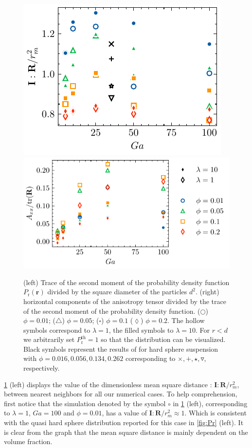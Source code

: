 \begin{figure}[h!]
    \centering
    \includegraphics[height=0.3\textwidth]{image/HOMOGENEOUS_NEW/PA/trR.pdf}
    \includegraphics[height=0.3\textwidth]{image/HOMOGENEOUS_NEW/PA/Axx.pdf}
    \caption{
        (left) Trace of the second moment of the probability density function $P_\text{r}(\textbf{r})$ divided by the square diameter of the particles $d^2$. 
        (right) horizontal components of the anisotropy tensor divided by the trace of the second moment of the probability density function.
    ($\pmb\bigcirc$) $\phi = 0.01$; ($\pmb\triangle$) $ \phi = 0.05$; ($\pmb\square$) $\phi = 0.1$ ($\pmb\lozenge$) $\phi = 0.2$.
    The hollow symbols correspond to $\lambda = 1$, the filled symbols to $\lambda = 10$.
    For $r<d$ we arbitrarily set $P_\text{r}^\text{th} = 1$ so that the distribution can be visualized.
    Black symbols represent the results of \citet{zhang2023evolution} for hard sphere suspension with $\phi = 0.016,0.056,0.134,0.262$  %
    corresponding to $\pmb\times,\pmb +, \pmb\star , \pmb\triangledown$, respectively.
    }
    \label{fig:A}
\end{figure}
\ref{fig:A} (left) displays the value of the dimensionless mean square distance : $\textbf{I}:\textbf{R}/r_m^2$, between nearest neighbors for all our numerical cases. 
To help comprehension, first notice that the simulation denoted by the symbol \textcolor{col1}{$\pmb\circ$} in \ref{fig:A} (left), corresponding to $\lambda = 1$, $Ga = 100$ and $\phi = 0.01$, has a value of $\textbf{I}:\textbf{R}/r_m^2 \approx 1$. Which is consistent with the quasi hard sphere distribution reported for this case in \ref{fig:Pr} (left). 
It is clear from the graph that the mean square distance is mainly dependent on the volume fraction. 
